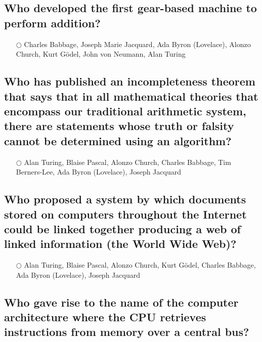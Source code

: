 \documentclass[a4paper,11pt,oneside]{article}
\begin{document}
\begin{sloppypar}
\subsection{Who developed the first gear-based machine to perform addition?}

\label{q:437:mc:en:True}

\begin{itemize}
  \item[$\bigcirc$] Charles Babbage, Joseph Marie Jacquard, Ada Byron (Lovelace), Alonzo Church, Kurt G\"odel, John von Neumann, Alan Turing
\end{itemize}



\subsection{Who has published an incompleteness theorem that says that in all mathematical theories that encompass our traditional arithmetic system, there are statements whose truth or falsity cannot be determined using an algorithm?}

\label{q:438:mc:en:True}

\begin{itemize}
  \item[$\bigcirc$] Alan Turing, Blaise Pascal, Alonzo Church, Charles Babbage, Tim Berners-Lee, Ada Byron (Lovelace), Joseph Jacquard
\end{itemize}



\subsection{Who proposed a system by which documents stored on computers throughout the Internet could be linked together producing a web of linked information (the World Wide Web)?}

\label{q:439:mc:en:True}

\begin{itemize}
  \item[$\bigcirc$] Alan Turing, Blaise Pascal, Alonzo Church, Kurt G\"odel, Charles Babbage, Ada Byron (Lovelace), Joseph Jacquard
\end{itemize}



\subsection{Who gave rise to the name of the computer architecture where the CPU retrieves instructions from memory over a central bus?}


\end{sloppypar}
\end{document}
